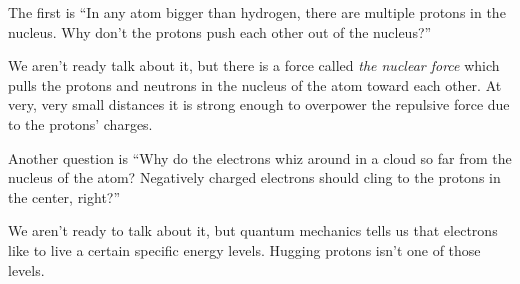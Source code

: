 The first is ``In any atom bigger than hydrogen, there are multiple
protons in the nucleus. Why don't the protons push each other out of
the nucleus?''

We aren't ready talk about it, but there is a force called \textit{the
 nuclear force} which pulls the protons and neutrons in the nucleus
of the atom toward each other. At very, very small distances it is
strong enough to overpower the repulsive force due to the protons'
charges.

Another question is ``Why do the electrons whiz around in a cloud so
far from the nucleus of the atom? Negatively charged electrons should
cling to the protons in the center, right?''

We aren't ready to talk about it, but quantum mechanics tells us that
electrons like to live a certain specific energy levels. Hugging
protons isn't one of those levels.
